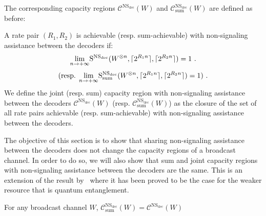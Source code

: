 The corresponding capacity regions $\mathcal{C}^{\mathrm{NS}_{\text{dec}}}(W)$ and $\mathcal{C}^{\mathrm{NS}_{\text{dec}}}_{\text{sum}}(W)$ are defined as before:

\begin{definition}
  A rate pair $(R_1,R_2)$ is achievable (resp. sum-achievable) with non-signaling assistance between the decoders if:
  \[ \underset{n \rightarrow +\infty}{\lim} \mathrm{S}^{\mathrm{NS}_{\text{dec}}}(W^{\otimes n},\lceil2^{R_1n}\rceil,\lceil2^{R_2n}\rceil) = 1 \ . \]
  \[ \text{(resp. }\underset{n \rightarrow +\infty}{\lim} \mathrm{S}^{\mathrm{NS}_{\text{dec}}}_{\text{sum}}(W^{\otimes n},\lceil2^{R_1n}\rceil,\lceil2^{R_2n}\rceil) = 1 )\ . \]
  We define the joint (resp. sum) capacity region with non-signaling assistance between the decoders $\mathcal{C}^{\mathrm{NS}_{\text{dec}}}(W)$ (resp. $\mathcal{C}^{\mathrm{NS}_{\text{dec}}}_{\text{sum}}(W)$) as the closure of the set of all rate pairs achievable (resp. sum-achievable) with non-signaling assistance between the decoders.
\end{definition}

The objective of this section is to show that sharing non-signaling assistance between the decoders does not change the capacity regions of a broadcast channel. In order to do so, we will also show that sum and joint capacity regions with non-signaling assistance between the decoders are the same. This is an extension of the result by~\cite{PDB21} where it has been proved to be the case for the weaker resource that is quantum entanglement.

\begin{proposition}
  \label{prop:NSdecoderssum}
  For any broadcast channel $W$, $\mathcal{C}_{\text{sum}}^{\mathrm{NS}_{\text{dec}}}(W)= \mathcal{C}^{\mathrm{NS}_{\text{dec}}}(W)$
\end{proposition}

